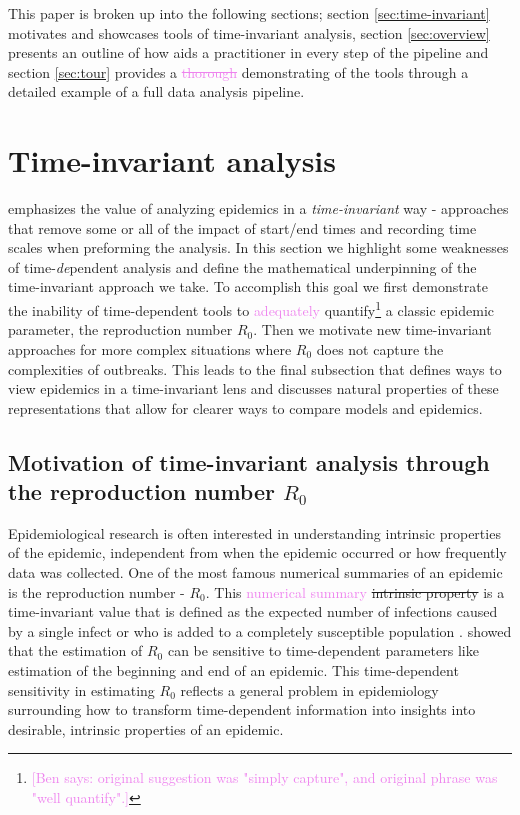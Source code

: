 \documentclass[
  shortnames]{jss}
\begin{document}
This paper is broken up into the following sections; section
\ref{sec:time-invariant} motivates and showcases tools of time-invariant
analysis, section \ref{sec:overview} presents an outline of how
 aids a practitioner in every step of the pipeline and
section \ref{sec:tour} provides a \textcolor{violet}{\sout{thorough}}
demonstrating of the tools through a detailed example of a full data
analysis pipeline.

\hypertarget{time-invariant-analysis}{%
\section{Time-invariant analysis}\label{time-invariant-analysis}}

 emphasizes the value of analyzing epidemics in a
\textit{time-invariant} way - approaches that remove some or all of the
impact of start/end times and recording time scales when preforming the
analysis. In this section we highlight some weaknesses of
time-\textit{de}pendent analysis and define the mathematical
underpinning of the time-invariant approach we take. To accomplish this
goal we first demonstrate the inability of time-dependent tools to
\textcolor{violet}{adequately}
quantify\footnote{\textcolor{violet}{[Ben says: original suggestion was "simply capture", and original phrase was "well quantify".]}}
a classic epidemic parameter, the reproduction number \(R_0\). Then we
motivate new time-invariant approaches for more complex situations where
\(R_0\) does not capture the complexities of outbreaks. This leads to
the final subsection that defines ways to view epidemics in a
time-invariant lens and discusses natural properties of these
representations that allow for clearer ways to compare models and
epidemics.

\subsection[Motivation through the reproduction number $R_0$]{Motivation
of time-invariant analysis through the reproduction number
\(R_0\)}\label{sec:r0_subsection}

Epidemiological research is often interested in understanding intrinsic
properties of the epidemic, independent from when the epidemic occurred
or how frequently data was collected. One of the most famous numerical
summaries of an epidemic is the reproduction number - \(R_0\). This
\textcolor{violet}{numerical summary} \sout{intrinsic property} is a
time-invariant value that is defined as the expected number of
infections caused by a single infect or who is added to a completely
susceptible population \citep{anderson1992}. \citet{Gallagher2020}
showed that the estimation of \(R_0\) can be sensitive to time-dependent
parameters like estimation of the beginning and end of an epidemic. This
time-dependent sensitivity in estimating \(R_0\) reflects a general
problem in epidemiology surrounding how to transform time-dependent
information into insights into desirable, intrinsic properties of an
epidemic.
\end{document}

